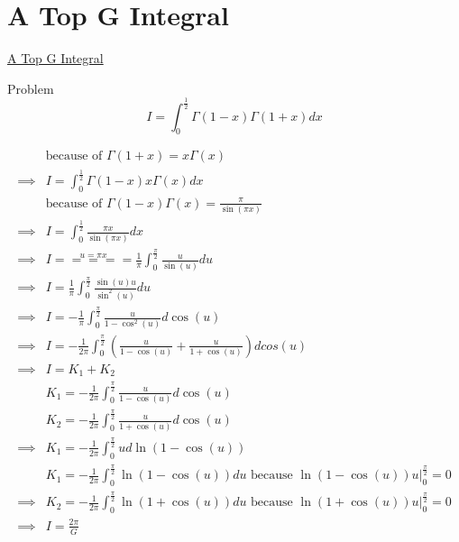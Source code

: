 \documentclass {article}
\begin{document}
\section{A Top G Integral}
\href{https://www.youtube.com/watch?v=pwJOEQPfNfQ}{A Top G Integral}


Problem  \[ I = \int_0^{\frac{1}{2}} \Gamma(1-x)\Gamma(1+x){d}x\]

\[
\begin{matrix}
          &  \text{because of } \Gamma(1+x) = x \Gamma(x)  \\
\implies  & I = \int_0^{\frac{1}{2}} \Gamma(1-x) x \Gamma(x){d}x \\
          & \text{because of  } \Gamma(1-x)\Gamma(x) = \frac{\pi}{\sin(\pi x)} \\
\implies  & I = \int_0^{\frac{1}{2}} \frac{\pi x}{\sin(\pi x)} {d}x \\
\implies  & I \stackrel{u = \pi x} {=====} \frac{1}{\pi} \int_0^{\frac{\pi}{2}} \frac{u}{\sin(u)} {d}u \\
\implies  & I = \frac{1}{\pi} \int_0^{\frac{\pi}{2}} \frac{\sin(u) u }{\sin^2(u)} {d}u \\
\implies  & I = -\frac{1}{\pi} \int_0^{\frac{\pi}{2}} \frac{u}{1 - \cos^2(u)} {d}\cos(u) \\
\implies  & I = -\frac{1}{2\pi} \int_0^{\frac{\pi}{2}} \left( \frac{u}{1-\cos(u)} + \frac{u}{1+\cos(u)} \right) {d}cos(u) \\
\implies  & I = K_1 + K_2 \\
          & K_1 = -\frac{1}{2\pi} \int_0^{\frac{\pi}{2}}  \frac{u}{1-\cos(u)} {d}\cos(u) \\
          & K_2 = -\frac{1}{2\pi} \int_0^{\frac{\pi}{2}}  \frac{u}{1+\cos(u)} {d}\cos(u) \\
\implies & K_1 = -\frac{1}{2\pi} \int_0^{\frac{\pi}{2}}  u {d}\ln(1-\cos(u)) \\
         & K_1 = -\frac{1}{2\pi} \int_0^{\frac{\pi}{2}} \ln(1-\cos(u)){d}u \text{  because  } \ln(1-\cos(u)) u \Big|_0^{\frac{\pi}{2}} = 0\\
\implies & K_2 = -\frac{1}{2\pi} \int_0^{\frac{\pi}{2}} \ln(1 + \cos(u)){d}u \text{  because } \ln(1+\cos(u)) u \Big|_0^{\frac{\pi}{2}} = 0 \\
\implies & I = \frac{2\pi}{G} \\
\end{matrix}
\]
\end{document}
